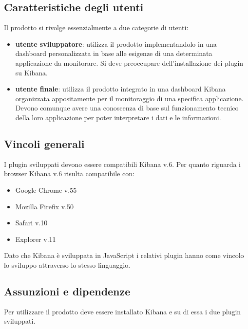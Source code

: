 	\subsection{Caratteristiche degli utenti}
	Il prodotto si rivolge essenzialmente a due categorie di utenti:
	\begin{itemize}
		\item \textbf{utente sviluppatore}: utilizza il prodotto implementandolo in una dashboard personalizzata in base alle esigenze di una determinata applicazione da monitorare. Si deve preoccupare dell'installazione dei plugin su Kibana.
		\item \textbf{utente finale}: utilizza il prodotto integrato in una dashboard Kibana organizzata appositamente per il monitoraggio di una specifica applicazione. Devono comunque avere una conoscenza di base sul funzionamento tecnico della loro applicazione per poter interpretare i dati e le informazioni.
	\end{itemize}
	\subsection{Vincoli generali}
	I plugin sviluppati devono essere compatibili  Kibana v.6.
	Per quanto riguarda i browser Kibana v.6 risulta compatibile con: 
	\begin{itemize}
		\item Google Chrome v.55
		\item Mozilla Firefix v.50
		\item Safari v.10
		\item  Explorer v.11
	\end{itemize}
	Dato che Kibana è sviluppata in JavaScript i relativi plugin hanno come vincolo lo sviluppo attraverso lo stesso linguaggio.
	
	\subsection{Assunzioni e dipendenze}
	Per utilizzare il prodotto deve essere installato Kibana e su di essa i due plugin sviluppati. 
	
